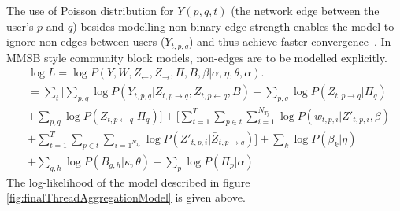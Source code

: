 \documentclass{sig-alternate}
\begin{document}
The use of Poisson distribution for $Y(p,q,t)$  (the 
network edge between the user's $p$ and $q$) besides modelling non-binary edge
strength enables the model to ignore non-edges between users ($Y_{t,p,q}$) and
thus achieve faster convergence~\cite{Kerrer:Newman}. In MMSB style community block models, 
	 non-edges are to be modelled
explicitly.
\vspace*{-0.5\baselineskip}
\small
\begin{align}
	&	\log L = \log \! P(Y, W, Z_{\leftarrow}, 
Z_{\rightarrow}, \Pi, B, \beta | \alpha, \eta, \theta, \alpha). \nonumber \\
      &= \sum_{t} \bigg[ \sum_{p,q} \! \log P(Y_{t,p, q} | Z_{t,p \rightarrow q} 
      , Z_{t,p \leftarrow q}, B) \nonumber  
      + \sum_{p,q} \log P(Z_{t, p \rightarrow q} | \Pi_q) \\ \nonumber 
      & + \sum_{p,q} \log \! P(Z_{t, p \leftarrow q} | \Pi_{q}) \bigg] 
      + \bigg[ \sum_{t=1}^{T} \! \sum_{p \in t} \sum_{i=1}^{N_{T_{p}}} 
      \log \! P(w_{t,p,i} | Z'_{t,p,i}, \beta) \\ \nonumber 
      & + \sum_{t=1}^{T} \sum_{p \in t} \sum_{i=1^{N_{T_{p}}}} \log \! 
      P(Z'_{t,p,i} | \bar{Z}_{t, p \rightarrow q}) \bigg] + \sum_{k} \log P(\beta_{k} | 
      \eta)  
      \\ & +  \sum_{g,h} \log P(B_{g,h} | \kappa, \theta)
	  + \sum_{p} \log \! P(\Pi_{p} | \alpha)
 \label{eqn:LL}
\end{align}
\normalsize
The log-likelihood of the model described in figure \ref{fig:finalThreadAggregationModel} is given
 above.
\end{document}
